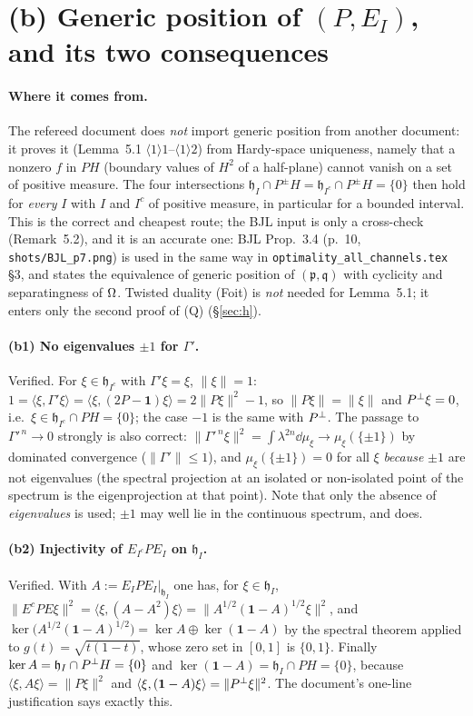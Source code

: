 \documentclass[11pt]{article}
\newcommand{\norm}[1]{\lVert #1\rVert}\newcommand{\abs}[1]{\lvert #1\rvert}
\newcommand{\ip}[2]{\langle #1,#2\rangle}\newcommand{\one}{\mathbf 1}
\begin{document}
\section{(b) Generic position of $(P,E_I)$, and its two consequences}\label{sec:b}

\paragraph{Where it comes from.}  The refereed document does \emph{not} import generic
position from another document: it proves it (Lemma~5.1 $\langle1\rangle1$--$\langle1\rangle2$)
from Hardy-space uniqueness, namely that a nonzero $f$ in $PH$ (boundary values of $H^2$ of a
half-plane) cannot vanish on a set of positive measure.  The four intersections
$\mathfrak h_I\cap P^{\pm}H=\mathfrak h_{I^c}\cap P^{\pm}H=\{0\}$ then hold for
\emph{every} $I$ with $I$ and $I^c$ of positive measure, in particular for a bounded
interval.  This is the correct and cheapest route; the BJL input is only a cross-check
(Remark~5.2), and it is an accurate one: BJL Prop.~3.4 (p.~10, \texttt{shots/BJL\_p7.png})
is used in the same way in \texttt{optimality\_all\_channels.tex} \S3, and states the
equivalence of generic position of $(\mathfrak p,\mathfrak q)$ with cyclicity and
separatingness of $\Omega$.  Twisted duality (Foit) is \emph{not} needed for Lemma~5.1; it
enters only the second proof of (Q) (\S\ref{sec:h}).

\paragraph{(b1) No eigenvalues $\pm1$ for $\Gamma'$.}  Verified.  For
$\xi\in\mathfrak h_{I^c}$ with $\Gamma'\xi=\xi$, $\norm\xi=1$:
$1=\ip\xi{\Gamma'\xi}=\ip\xi{(2P-\one)\xi}=2\norm{P\xi}^2-1$, so $\norm{P\xi}=\norm\xi$ and
$P^{\perp}\xi=0$, i.e.\ $\xi\in\mathfrak h_{I^c}\cap PH=\{0\}$; the case $-1$ is the same with
$P^{\perp}$.  The passage to $\Gamma'^{\,n}\to0$ strongly is also correct:
$\norm{\Gamma'^{\,n}\xi}^2=\int\lambda^{2n}\dd\mu_\xi\to\mu_\xi(\{\pm1\})$ by dominated
convergence ($\norm{\Gamma'}\le1$), and $\mu_\xi(\{\pm1\})=0$ for all $\xi$ \emph{because}
$\pm1$ are not eigenvalues (the spectral projection at an isolated or non-isolated point of
the spectrum is the eigenprojection at that point).  Note that only the absence of
\emph{eigenvalues} is used; $\pm1$ may well lie in the continuous spectrum, and does.

\paragraph{(b2) Injectivity of $E_{I^c}PE_I$ on $\mathfrak h_I$.}  Verified.  With
$A:=E_IPE_I|_{\mathfrak h_I}$ one has, for $\xi\in\mathfrak h_I$,
$\norm{E^cPE\xi}^2=\ip\xi{(A-A^2)\xi}=\norm{A^{1/2}(\one-A)^{1/2}\xi}^2$, and
$\ker\bigl(A^{1/2}(\one-A)^{1/2}\bigr)=\ker A\oplus\ker(\one-A)$ by the spectral theorem
applied to $g(t)=\sqrt{t(1-t)}$, whose zero set in $[0,1]$ is $\{0,1\}$.  Finally
$\ker A=\mathfrak h_I\cap P^{\perp} H=\{0\}$ and $\ker(\one-A)=\mathfrak h_I\cap PH=\{0\}$,
because $\ip\xi{A\xi}=\norm{P\xi}^2$ and $\ip\xi{(\one-A)\xi}=\norm{\Pperp\xi}^2$.  The
document's one-line justification says exactly this.
\end{document}
